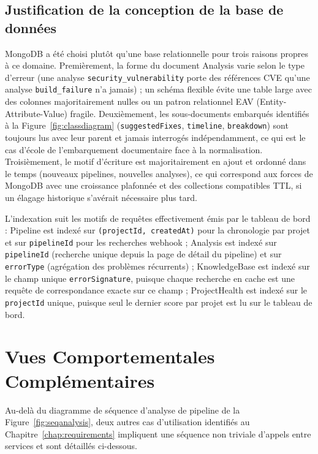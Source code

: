 \documentclass[12pt,a4paper,oneside]{report}
\begin{document}
\subsection{Justification de la conception de la base de données}
MongoDB a été choisi plutôt qu'une base relationnelle pour trois raisons propres à ce domaine. Premièrement, la forme du document Analysis varie selon le type d'erreur (une analyse \texttt{security\_vulnerability} porte des références CVE qu'une analyse \texttt{build\_failure} n'a jamais) ; un schéma flexible évite une table large avec des colonnes majoritairement nulles ou un patron relationnel EAV (Entity-Attribute-Value) fragile. Deuxièmement, les sous-documents embarqués identifiés à la Figure~\ref{fig:classdiagram} (\texttt{suggestedFixes}, \texttt{timeline}, \texttt{breakdown}) sont toujours lus avec leur parent et jamais interrogés indépendamment, ce qui est le cas d'école de l'embarquement documentaire face à la normalisation. Troisièmement, le motif d'écriture est majoritairement en ajout et ordonné dans le temps (nouveaux pipelines, nouvelles analyses), ce qui correspond aux forces de MongoDB avec une croissance plafonnée et des collections compatibles TTL, si un élagage historique s'avérait nécessaire plus tard.

L'indexation suit les motifs de requêtes effectivement émis par le tableau de bord : Pipeline est indexé sur \texttt{(projectId, createdAt)} pour la chronologie par projet et sur \texttt{pipelineId} pour les recherches webhook ; Analysis est indexé sur \texttt{pipelineId} (recherche unique depuis la page de détail du pipeline) et sur \texttt{errorType} (agrégation des problèmes récurrents) ; KnowledgeBase est indexé sur le champ unique \texttt{errorSignature}, puisque chaque recherche en cache est une requête de correspondance exacte sur ce champ ; ProjectHealth est indexé sur le \texttt{projectId} unique, puisque seul le dernier score par projet est lu sur le tableau de bord.

\section{Vues Comportementales Complémentaires}
Au-delà du diagramme de séquence d'analyse de pipeline de la Figure~\ref{fig:seqanalysis}, deux autres cas d'utilisation identifiés au Chapitre~\ref{chap:requirements} impliquent une séquence non triviale d'appels entre services et sont détaillés ci-dessous.
\end{document}
